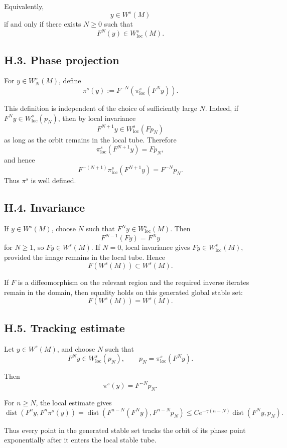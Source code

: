 \documentclass[12pt,a4paper]{article}
\theoremstyle{plain}
\numberwithin{equation}{section}
\numberwithin{theorem}{section}
\begin{document}
Equivalently,
\[
y\in W^s(M)
\]
if and only if there exists $N\ge0$ such that
\[
F^N(y)
\in
W^s_{\mathrm{loc}}(M).
\]

\subsection{H.3. Phase projection}

For $y\in W_N^s(M)$, define
\[
\pi^s(y):=F^{-N}\left(
\pi^s_{\mathrm{loc}}(F^N y)
\right).
\]

This definition is independent of the choice of sufficiently large $N$. Indeed, if $F^N y\in W^s_{\mathrm{loc}}(p_N)$, then by local invariance
\[
F^{N+1}y
\in
W^s_{\mathrm{loc}}(Fp_N)
\]
as long as the orbit remains in the local tube. Therefore
\[
\pi^s_{\mathrm{loc}}(F^{N+1}y)=F p_N,
\]
and hence
\[
F^{-(N+1)}
\pi^s_{\mathrm{loc}}(F^{N+1}y)
=
F^{-N}p_N.
\]
Thus $\pi^s$ is well defined.

\subsection{H.4. Invariance}

If $y\in W^s(M)$, choose $N$ such that $F^N y\in W^s_{\mathrm{loc}}(M)$. Then
\[
F^{N-1}(Fy)=F^N y
\]
for $N\ge1$, so $Fy\in W^s(M)$. If $N=0$, local invariance gives $Fy\in W^s_{\mathrm{loc}}(M)$, provided the image remains in the local tube. Hence
\[
F(W^s(M))
\subset
W^s(M).
\]

If $F$ is a diffeomorphism on the relevant region and the required inverse iterates remain in the domain, then equality holds on this generated global stable set:
\[
F(W^s(M))=W^s(M).
\]

\subsection{H.5. Tracking estimate}

Let $y\in W^s(M)$, and choose $N$ such that
\[
F^N y
\in W^s_{\mathrm{loc}}(p_N),
\qquad
p_N=
\pi^s_{\mathrm{loc}}(F^N y).
\]

Then
\[
\pi^s(y)=F^{-N}p_N.
\]

For $n\ge N$, the local estimate gives
\[
\operatorname{dist}
\left(
F^n y,
F^n\pi^s(y)
\right)
=
\operatorname{dist}
\left(
F^{n-N}(F^N y),
F^{n-N}p_N
\right)
\le
C e^{-\gamma(n-N)}
\operatorname{dist}(F^N y,p_N).
\]

Thus every point in the generated stable set tracks the orbit of its phase point exponentially after it enters the local stable tube.
\end{document}
